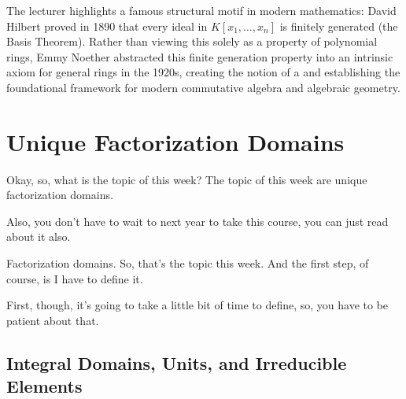 \begin{insight}
The lecturer highlights a famous structural motif in modern mathematics:  David Hilbert proved in 1890 that every ideal in $K[x_1, \dots, x_n]$ is finitely generated (the Basis Theorem). Rather than viewing this solely as a property of polynomial rings, Emmy Noether abstracted this finite generation property into an intrinsic axiom for general rings in the 1920s, creating the notion of a  and establishing the foundational framework for modern commutative algebra and algebraic geometry.
\end{insight}

\section{Unique Factorization Domains}

\begin{speech}[00:04:50 - 00:06:05]
Okay, so, what is the topic of this week? The topic of this week are unique factorization domains. 

Also, you don't have to wait to next year to take this course, you can just read about it also.

Factorization domains.  So, that's the topic this week. And the first step, of course, is I have to define it.

First, though, it's going to take a little bit of time to define, so, you have to be patient about that.
\end{speech}

\begin{hidden}
\end{hidden}

\subsection{Integral Domains, Units, and Irreducible Elements}

